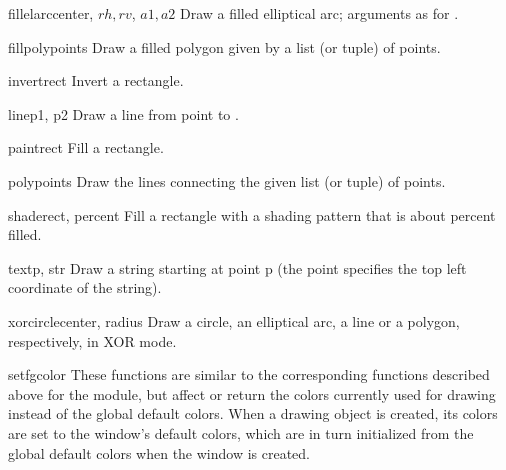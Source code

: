 \begin{funcdesc}{fillelarc}{center, \(rh, rv\), \(a1, a2\)}
Draw a filled elliptical arc; arguments as for .
\end{funcdesc}

\begin{funcdesc}{fillpoly}{points}
Draw a filled polygon given by a list (or tuple) of points.
\end{funcdesc}

\begin{funcdesc}{invert}{rect}
Invert a rectangle.
\end{funcdesc}

\begin{funcdesc}{line}{p1, p2}
Draw a line from point
to
.
\end{funcdesc}

\begin{funcdesc}{paint}{rect}
Fill a rectangle.
\end{funcdesc}

\begin{funcdesc}{poly}{points}
Draw the lines connecting the given list (or tuple) of points.
\end{funcdesc}

\begin{funcdesc}{shade}{rect, percent}
Fill a rectangle with a shading pattern that is about
percent filled.
\end{funcdesc}

\begin{funcdesc}{text}{p, str}
Draw a string starting at point p (the point specifies the
top left coordinate of the string).
\end{funcdesc}

\begin{funcdesc}{xorcircle}{center, radius}
Draw a circle, an elliptical arc, a line or a polygon, respectively,
in XOR mode.
\end{funcdesc}

\begin{funcdesc}{setfgcolor}{}
These functions are similar to the corresponding functions described
above for the
module, but affect or return the colors currently used for drawing
instead of the global default colors.
When a drawing object is created, its colors are set to the window's
default colors, which are in turn initialized from the global default
colors when the window is created.
\end{funcdesc}

